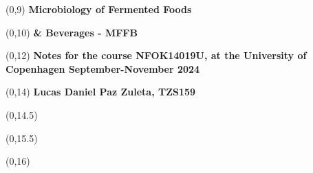 \begin{titlepage}


\begin{textblock}{9.4}(0,9)
    \Huge{\sffamily\bfseries{Microbiology of Fermented Foods}}
\end{textblock}
\begin{textblock}{9.4}(0,10)
    \Huge{\sffamily\bfseries{\& Beverages - MFFB}}
\end{textblock}

\begin{textblock}{9.4}(0,12)
    \LARGE{\sffamily\bfseries{Notes for the course NFOK14019U, at the University of Copenhagen September-November 2024}}
\end{textblock}

\begin{textblock}{9.4}(0,14)
    \large{\sffamily\bfseries{Lucas Daniel Paz Zuleta, TZS159}}
\end{textblock}

\begin{textblock}{9.4}(0,14.5)
    \large{}
\end{textblock}

\begin{textblock}{9.4}(0,15.5)
    \large{}
\end{textblock}

\begin{textblock}{8.4}(0,16)
    \large{}
\end{textblock}

\end{titlepage}